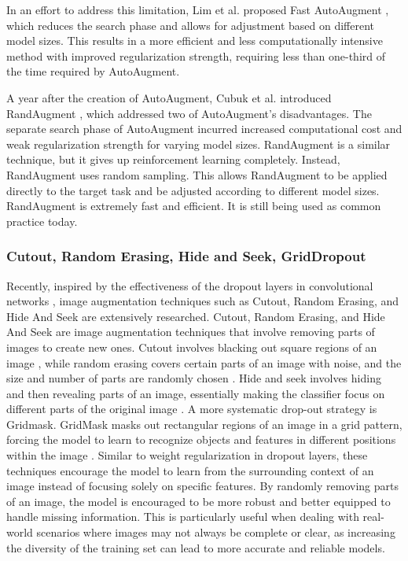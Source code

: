 In an effort to address this limitation, Lim et al. proposed Fast AutoAugment \cite{lim2019fast}, which reduces the search phase and allows for adjustment based on different model sizes. This results in a more efficient and less computationally intensive method with improved regularization strength, requiring less than one-third of the time required by AutoAugment. 

A year after the creation of AutoAugment, Cubuk et al. introduced RandAugment \cite{cubuk2020randaugment}, which addressed two of AutoAugment's disadvantages. The separate search phase of AutoAugment incurred increased computational cost and weak regularization strength for varying model sizes. RandAugment is a similar technique, but it gives up reinforcement learning completely. Instead, RandAugment uses random sampling. This allows RandAugment to be applied directly to the target task and be adjusted according to different model sizes. RandAugment is extremely fast and efficient. It is still being used as common practice today.

\subsubsection{Cutout, Random Erasing, Hide and Seek, GridDropout}
Recently, inspired by the effectiveness of the dropout layers in convolutional networks \cite{srivastava2014dropout}, image augmentation techniques such as Cutout, Random Erasing, and Hide And Seek are extensively researched. Cutout, Random Erasing, and Hide And Seek are image augmentation techniques that involve removing parts of images to create new ones. Cutout involves blacking out square regions of an image \cite{devries2017improved}, while random erasing covers certain parts of an image with noise, and the size and number of parts are randomly chosen \cite{zhong2020random}. Hide and seek involves hiding and then revealing parts of an image, essentially making the classifier focus on different parts of the original image \cite{singh2018hide}. A more systematic drop-out strategy is Gridmask. GridMask masks out rectangular regions of an image in a grid pattern, forcing the model to learn to recognize objects and features in different positions within the image \cite{chen2020gridmask}. Similar to weight regularization in dropout layers, these techniques encourage the model to learn from the surrounding context of an image instead of focusing solely on specific features. By randomly removing parts of an image, the model is encouraged to be more robust and better equipped to handle missing information. This is particularly useful when dealing with real-world scenarios where images may not always be complete or clear, as increasing the diversity of the training set can lead to more accurate and reliable models.

